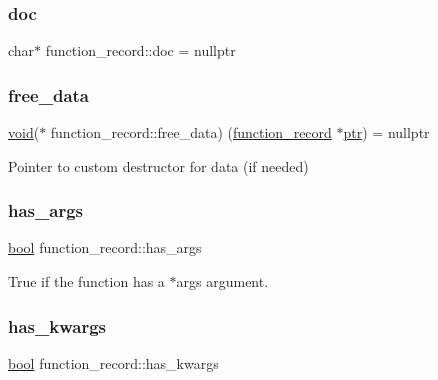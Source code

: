 \subsubsection{\texorpdfstring{doc}{doc}}
{\footnotesize\ttfamily char$\ast$ function\+\_\+record\+::doc = nullptr}

\mbox{\label{structfunction__record_aa3019482c3aba125c05edf641d557576}} 
\subsubsection{\texorpdfstring{free\_data}{free\_data}}
{\footnotesize\ttfamily \mbox{\hyperlink{_s_d_l__opengles2__gl2ext_8h_ae5d8fa23ad07c48bb609509eae494c95}{void}}($\ast$ function\+\_\+record\+::free\+\_\+data) (\mbox{\hyperlink{structfunction__record}{function\+\_\+record}} $\ast$\mbox{\hyperlink{pystrtod_8h_a671b2e1a427060ad8b5362882ed58f5b}{ptr}}) = nullptr}



Pointer to custom destructor for \textquotesingle{}data\textquotesingle{} (if needed) 

\mbox{\label{structfunction__record_af05b5fc3d6d3b5bcec45bbd1c3e75f15}} 
\subsubsection{\texorpdfstring{has\_args}{has\_args}}
{\footnotesize\ttfamily \mbox{\hyperlink{asdl_8h_af6a258d8f3ee5206d682d799316314b1}{bool}} function\+\_\+record\+::has\+\_\+args}



True if the function has a \textquotesingle{}$\ast$args\textquotesingle{} argument. 

\mbox{\label{structfunction__record_af72350bd8c047108e403ff873c0a1f7d}} 
\subsubsection{\texorpdfstring{has\_kwargs}{has\_kwargs}}
{\footnotesize\ttfamily \mbox{\hyperlink{asdl_8h_af6a258d8f3ee5206d682d799316314b1}{bool}} function\+\_\+record\+::has\+\_\+kwargs}



